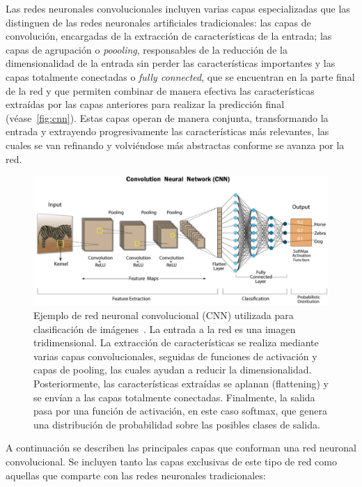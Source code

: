 Las redes neuronales convolucionales incluyen varias capas especializadas que las distinguen de las redes neuronales artificiales tradicionales: las capas de convolución, encargadas de la extracción de características de la entrada; las capas de agrupación o \emph{poooling}, responsables de la reducción de la dimensionalidad de la entrada sin perder las características importantes y las capas totalmente conectadas o \emph{fully connected}, que se encuentran en la parte final de la red y que permiten combinar de manera efectiva las características extraídas por las capas anteriores para realizar la predicción final (véase~\autoref{fig:cnn}). Estas capas operan de manera conjunta, transformando la entrada y extrayendo progresivamente las características más relevantes, las cuales se van refinando y volviéndose más abstractas conforme se avanza por la red.\newline

\begin{figure}[h]
    \centering
    \includegraphics[width=0.8\linewidth]{img/cnn.png}
    \caption[Ejemplo de red neuronal convolucional (CNN) utilizada para clasificación de imágenes~\cite{CNNSwapna}.]{Ejemplo de red neuronal convolucional (CNN) utilizada para clasificación de imágenes~\cite{CNNSwapna}. La entrada a la red es una imagen tridimensional. La extracción de características se realiza mediante varias capas convolucionales, seguidas de funciones de activación y capas de pooling, las cuales ayudan a reducir la dimensionalidad. Posteriormente, las características extraídas se aplanan (flattening) y se envían a las capas totalmente conectadas. Finalmente, la salida pasa por una función de activación, en este caso softmax, que genera una distribución de probabilidad sobre las posibles clases de salida.}\label{fig:cnn}
\end{figure}

A continuación se describen las principales capas que conforman una red neuronal convolucional. Se incluyen tanto las capas exclusivas de este tipo de red como aquellas que comparte con las redes neuronales tradicionales:


